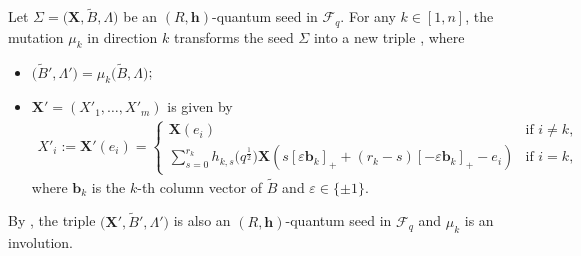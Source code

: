 \documentclass[10pt,a4paper]{amsart}
\numberwithin{equation}{section}
\begin{document}
 \begin{Definition}\label{mutation_of_generalzied_seed}
Let $\Sigma=\bigl(\mathbf{X},\tilde{B},\Lambda\bigr)$ be an $(R,\mathbf{h})$-quantum seed in $\mathcal{F}_q$. For any $k\in[1,n]$, the mutation $\mu_k$ in direction $k$ transforms the seed $\Sigma$ into a new triple , where
\begin{itemize}\itemsep=0pt
\item[(1)] $\bigl(\tilde{B}', \Lambda'\bigr)=\mu_{k}\bigl(\tilde{B},\Lambda\bigr)$;
\item[(2)] $\mathbf{X}'=(X'_1,\dots, X'_m)$ is given by
\begin{align*}
 X'_i:=\mathbf{X}'(e_i)=\begin{cases}
 \mathbf{X}(e_i)&\text{if }i\neq k,\\
 \displaystyle\sum\limits_{s=0}^{r_k}h_{k,s}\bigl(q^{\frac{1}{2}}\bigr)\mathbf{X}(s[\varepsilon \mathbf{b}_k]_{+}+(r_{k}-s)[-\varepsilon \mathbf{b}_k]_+-e_i)&\text{if }i=k,
 \end{cases}
\end{align*}
where $\mathbf{b}_k$ is the $k$-th column vector of $\tilde{B}$ and $\varepsilon\in\{\pm 1\}$.
\end{itemize}
\end{Definition}
By \cite[Propositions 3.6 and 3.7]{BCDX2018}, the triple $\bigl(\mathbf{X}',\tilde{B}',\Lambda'\bigr)$ is also an $(R,\mathbf{h})$-quantum seed in $\mathcal{F}_q$ and $\mu_{k}$ is an involution.
\end{document}
